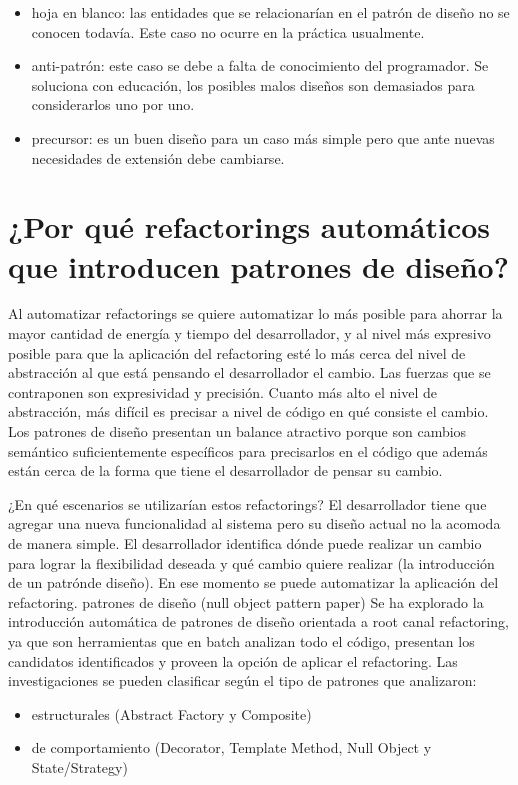 \begin{itemize}
    \item hoja en blanco: las entidades que se relacionarían en el patrón de diseño no se conocen
    todavía. Este caso no ocurre en la práctica usualmente.
    \item anti-patrón: este caso se debe a falta de conocimiento del programador. Se soluciona con
    educación, los posibles malos diseños son demasiados para considerarlos uno por uno.
    \item precursor: es un buen diseño para un caso más simple pero que ante nuevas necesidades de
    extensión debe cambiarse.
\end{itemize}

\section{¿Por qué refactorings automáticos que introducen patrones de diseño?}
Al automatizar refactorings se
quiere automatizar lo más posible para ahorrar la mayor cantidad de energía y tiempo del
desarrollador, y al nivel más expresivo posible para que la aplicación del refactoring esté lo más
cerca del nivel de abstracción al que está pensando el desarrollador el cambio. Las fuerzas que se
contraponen son expresividad y precisión. Cuanto más alto el nivel de abstracción, más difícil es
precisar a nivel de código en qué consiste el cambio. Los patrones de diseño presentan un balance
atractivo porque son cambios semántico suficientemente específicos para precisarlos en el código que
además están cerca de la forma que tiene el desarrollador de pensar su cambio.

¿En qué escenarios se utilizarían estos refactorings? El desarrollador tiene que agregar una nueva
funcionalidad al sistema pero su diseño actual no la acomoda de manera simple. El desarrollador
identifica dónde puede realizar un cambio para lograr la flexibilidad deseada y qué cambio quiere
realizar (la introducción de un patrónde diseño). En ese momento se puede automatizar la aplicación
del refactoring. patrones de diseño (null object pattern paper) Se ha explorado la introducción
automática de patrones de diseño orientada a root canal refactoring, ya que son herramientas que en
batch analizan todo el código, presentan los candidatos identificados y proveen la opción de aplicar
el refactoring. Las investigaciones se pueden clasificar según el tipo de patrones que analizaron:

\begin{itemize}
    \item estructurales (Abstract Factory y Composite)
    \item de comportamiento (Decorator, Template Method, Null Object y State/Strategy)
\end{itemize}

